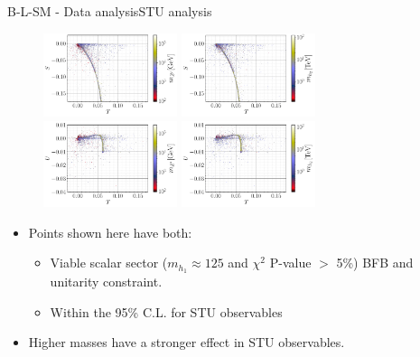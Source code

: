 \documentclass[10pt,xcolor=dvipsnames,mathserif]{beamer}
\begin{document}
\begin{frame}{B-L-SM - Data analysis}{STU analysis}
    \begin{figure}[!htb]
\centering
\includegraphics[width=0.35\textwidth]{Images/BLSM_2/TS_Zp.pdf}
\includegraphics[width=0.35\textwidth]{Images/BLSM_2/TS_HP.pdf}
\includegraphics[width=0.35\textwidth]{Images/BLSM_2/TU_Zp.pdf}
\includegraphics[width=0.35\textwidth]{Images/BLSM_2/TU_HP.pdf}
\end{figure}	

\begin{itemize}
    \item Points shown here have both:
    \begin{itemize}
        \item Viable scalar sector ($m_{h_1} \approx 125$ and $\chi^2$ P-value $>$ 5\%) BFB and unitarity constraint. 
        \item Within the 95\% C.L. for STU observables
    \end{itemize}
     
    \item Higher masses have a stronger effect in STU observables.
\end{itemize} 

\end{frame} 
\end{document}
